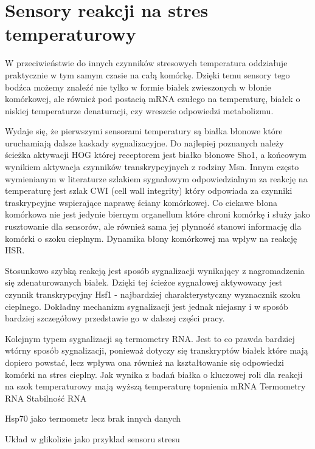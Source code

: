 \documentclass{pracamgr}
\begin{document}

\section{Sensory reakcji na stres temperaturowy}

W przeciwieństwie do innych czynników stresowych temperatura oddziałuje praktycznie w tym samym czasie na całą komórkę. 
Dzięki temu sensory tego bodźca możemy znaleźć nie tylko w formie białek zwieszonych w błonie komórkowej, ale również 
pod postacią mRNA czułego na temperaturę, białek o niskiej temperaturze denaturacji, czy wreszcie odpowiedzi metabolizmu.

Wydaje się, że pierwszymi sensorami temperatury są białka błonowe które uruchamiają dalsze kaskady sygnalizacyjne. Do 
najlepiej poznanych należy ścieżka aktywacji HOG której receptorem jest białko błonowe Sho1, a końcowym wynikiem 
aktywacja czynników transkrypcyjnych z rodziny Msn\cite{SensingLesson}. Innym często wymienianym w literaturze szlakiem sygnałowym odpowiedzialnym 
za reakcję na temperaturę jest szlak CWI (cell wall integrity) który odpowiada za czynniki traskrypcyjne wspierające 
naprawę ściany komórkowej. \cite{CWI} %
 Co ciekawe błona komórkowa nie jest jedynie biernym organellum które chroni
 komórkę i służy jako rusztowanie dla sensorów, ale również sama jej płynność stanowi informację dla komórki o szoku cieplnym.
 Dynamika błony komórkowej ma wpływ na reakcję HSR\cite{Carratu96}.

Stosunkowo szybką reakcją jest sposób sygnalizacji wynikający z nagromadzenia się zdenaturowanych białek. Dzięki tej ścieżce
sygnałowej aktywowany jest czynnik transkrypcyjny Hsf1 - najbardziej charakterystyczny wyznacznik szoku cieplnego. Dokładny mechanizm
sygnalizacji jest jednak niejasny i w sposób bardziej szczegółowy przedstawie go w dalszej części pracy.

Kolejnym typem sygnalizacji są termometry RNA. Jest to co prawda bardziej wtórny sposób sygnalizacji, ponieważ dotyczy się
transkryptów białek które mają dopiero powstać, lecz wpływa ona również na kształtowanie się odpowiedzi komórki na stres cieplny.
Jak wynika z badań białka o kluczowej roli dla reakcji na szok temperaturowy mają wyższą temperaturę topnienia mRNA 
Termometry RNA \cite{RNAterm}
Stabilność RNA \cite{Roca11}


Hsp70 jako termometr lecz brak innych danych

Układ w glikolizie jako przyklad sensoru stresu 
% 
% 
%  
% 
%  
%  
% 
% 
% 
%  
% 
% 
% 
\end{document}
